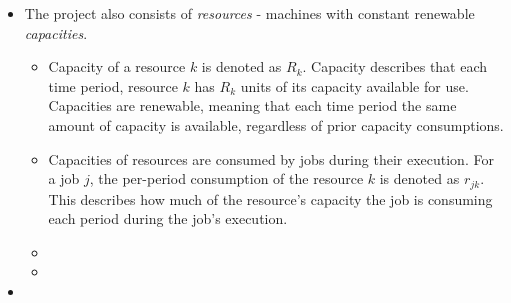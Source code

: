 \begin{itemize}
\begin{itemize}
        \item The project also consists of \emph{resources} - machines with constant renewable \emph{capacities}.
        \begin{itemize}
            \item Capacity of a resource $k$ is denoted as $R_k$. Capacity describes that each time period,
                resource $k$ has $R_k$ units of its capacity available for use. Capacities are renewable,
                meaning that each time period the same amount of capacity is available, regardless of prior
                capacity consumptions.

            \item Capacities of resources are consumed by jobs during their execution. For a job $j$,
                the per-period consumption of the resource $k$ is denoted as $r_{jk}$. This describes how much
                of the resource's capacity the job is consuming each period during the job's execution.

            \item {}
            \item {}
        \end{itemize}

        \item {}
    \end{itemize}


\end{itemize}
